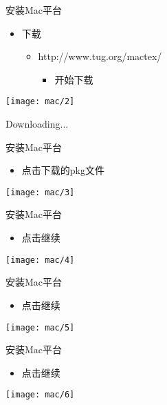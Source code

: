 \documentclass[fontset = none, t]{ctexbeamer}
\begin{document}
\begin{frame}{安装\tl}{Mac平台}
  \begin{itemize}
  \item 下载
    \begin{itemize}
    \item
      http://www.tug.org/mactex/
      \begin{itemize}
      \item 开始下载
      \end{itemize}      
    \end{itemize}
  \end{itemize}
  \centering
  \vfill
  \texttt{[image: mac/2]}
  \vfill
\end{frame}

\begin{frame}
  Downloading...
\end{frame}


\begin{frame}{安装\tl}{Mac平台}
  \begin{itemize}
  \item 点击下载的pkg文件
  \end{itemize}
  \centering
  \vfill
  \texttt{[image: mac/3]}
  \vfill
\end{frame}

\begin{frame}{安装\tl}{Mac平台}
  \begin{itemize}
  \item 点击继续
  \end{itemize}
  \centering
  \vfill
  \texttt{[image: mac/4]}
  \vfill
\end{frame}

\begin{frame}{安装\tl}{Mac平台}
  \begin{itemize}
  \item 点击继续
  \end{itemize}
  \centering
  \vfill
  \texttt{[image: mac/5]}
  \vfill
\end{frame}

\begin{frame}{安装\tl}{Mac平台}
  \begin{itemize}
  \item 点击继续
  \end{itemize}
  \centering
  \vfill
  \texttt{[image: mac/6]}
  \vfill
\end{frame}
\end{document}
